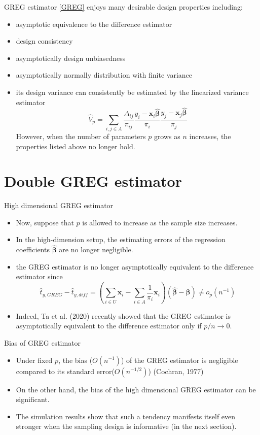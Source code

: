 \documentclass[usenames,dvipsnames, xcolor=table]{beamer}
\renewcommand{\bf}[1]{\boldsymbol{\mathbf{#1}}}
\newcommand{\pa}[1]{\left(#1\right)} %
\begin{document}
\begin{frame}{GREG estimator}
    \eqref{GREG} enjoys many desirable design properties including:
    \begin{itemize}
        \item asymptotic equivalence to the difference estimator
        \item design consistency
        \item asymptotically design unbiasedness
        \item asymptotically normally distribution with finite variance
        \item its design variance can consistently be estimated by the linearized variance estimator
        \begin{equation}
    \hat V_p = \sum_{i,j \in A} \frac{\Delta_{ij}}{\pi_{ij}} \frac{y_i - \bf x_i \hat {\bf \beta}}{\pi_i}\frac{y_j - \bf x_j \hat {\bf \beta}}{\pi_j} \label{var}
\end{equation}
However, when the number of parameters $p$ grows as $n$ increases, the properties listed above no longer hold.
    \end{itemize}
\end{frame}

\section{Double GREG estimator}

\begin{frame}{High dimensional GREG estimator}
\begin{itemize}
    \item Now, suppose that $p$ is allowed to increase as the sample size increases.
    \item In the high-dimension setup, the estimating errors of the regression coefficients $\hat {\bf \beta}$ are no longer negligible.
    \item the GREG estimator is no longer asymptotically equivalent to the difference estimator since
$$
\hat t_{y, GREG} - \hat t_{y, diff} = 
\pa{\sum_{i \in U} \bf x_i - \sum_{i \in A}\frac{1}{\pi_i} \bf x_i } \pa{\hat {\bf \beta} - \bf \beta} \neq o_p(n^{-1}) 
$$
\item Indeed, Ta et al. (2020) recently showed that the GREG estimator is asymptotically equivalent to the difference estimator only if $p / n \to 0$.
\end{itemize}
\end{frame}

\begin{frame}{Bias of GREG estimator}
\begin{itemize}
    \item Under fixed $p$, the bias ($O(n^{-1})$) of the GREG estimator is negligible compared to its standard error($O(n^{-1/2})$) (Cochran, 1977)
    \item On the other hand, the bias of the high dimensional GREG estimator can be significant.
    \item The simulation results show that such a tendency manifests itself even stronger when the sampling design is informative (in the next section).
\end{itemize}
\end{frame}
\end{document}
